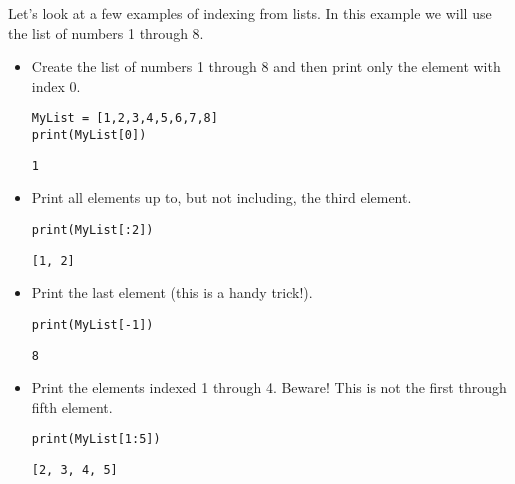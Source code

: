 \begin{example}
Let's look at a few examples of indexing from lists.  In this example we will use the list
of numbers 1 through 8.
\begin{itemize}
    \item Create the list of numbers 1 through 8 and then print only the element
        with index 0.

\bcode        
\begin{lstlisting}
MyList = [1,2,3,4,5,6,7,8] 
print(MyList[0]) 
\end{lstlisting}
\boutput
\begin{lstlisting}
1
\end{lstlisting}
\item Print all elements up to, but not including, the third element.

\bcode    
\begin{lstlisting}
print(MyList[:2]) 
\end{lstlisting}
\boutput
\begin{lstlisting}
[1, 2]
\end{lstlisting}

\item Print the last element (this is a handy trick!).

\bcode
\begin{lstlisting}
print(MyList[-1]) 
\end{lstlisting}
\boutput
\begin{lstlisting}
8
\end{lstlisting}

\item Print the elements indexed 1 through 4. Beware!  This is not the first through fifth
    element.

\bcode
\begin{lstlisting}
print(MyList[1:5]) 
\end{lstlisting}
\boutput
\begin{lstlisting}
[2, 3, 4, 5]
\end{lstlisting}
\end{itemize}
\end{example}


